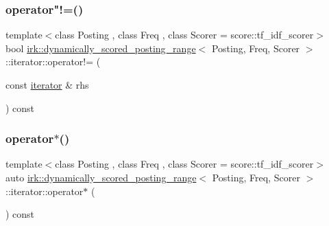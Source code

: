 \subsubsection{\texorpdfstring{operator"!=()}{operator!=()}}
{\footnotesize\ttfamily template$<$class Posting , class Freq , class Scorer  = score\+::tf\+\_\+idf\+\_\+scorer$>$ \\
bool \mbox{\hyperlink{classirk_1_1dynamically__scored__posting__range}{irk\+::dynamically\+\_\+scored\+\_\+posting\+\_\+range}}$<$ Posting, Freq, Scorer $>$\+::iterator\+::operator!= (\begin{DoxyParamCaption}\item[{const \mbox{\hyperlink{classirk_1_1dynamically__scored__posting__range_1_1iterator}{iterator}} \&}]{rhs }\end{DoxyParamCaption}) const\hspace{0.3cm}{\ttfamily [inline]}}

\mbox{\label{classirk_1_1dynamically__scored__posting__range_1_1iterator_a27fd9b96b377548db1926ccec2d8257b}} 
\subsubsection{\texorpdfstring{operator$\ast$()}{operator*()}}
{\footnotesize\ttfamily template$<$class Posting , class Freq , class Scorer  = score\+::tf\+\_\+idf\+\_\+scorer$>$ \\
auto \mbox{\hyperlink{classirk_1_1dynamically__scored__posting__range}{irk\+::dynamically\+\_\+scored\+\_\+posting\+\_\+range}}$<$ Posting, Freq, Scorer $>$\+::iterator\+::operator$\ast$ (\begin{DoxyParamCaption}{ }\end{DoxyParamCaption}) const\hspace{0.3cm}{\ttfamily [inline]}}

\mbox{\label{classirk_1_1dynamically__scored__posting__range_1_1iterator_ab0b13832e06fa3f84b3db97cab912a7e}} 
